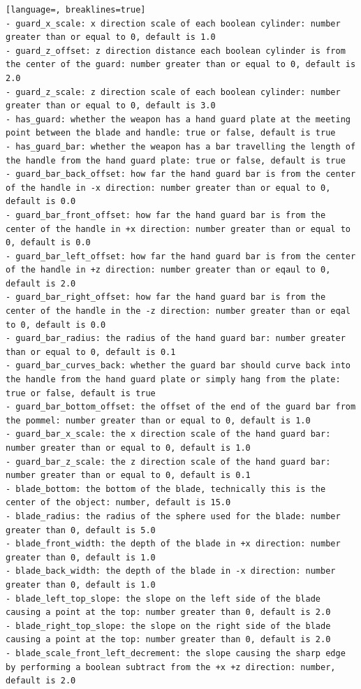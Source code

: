 \documentclass[12pt,a4paper]{article}
\begin{document}
\begin{lstlisting}[language=, breaklines=true]
- guard_x_scale: x direction scale of each boolean cylinder: number greater than or equal to 0, default is 1.0
- guard_z_offset: z direction distance each boolean cylinder is from the center of the guard: number greater than or equal to 0, default is 2.0
- guard_z_scale: z direction scale of each boolean cylinder: number greater than or equal to 0, default is 3.0
- has_guard: whether the weapon has a hand guard plate at the meeting point between the blade and handle: true or false, default is true
- has_guard_bar: whether the weapon has a bar travelling the length of the handle from the hand guard plate: true or false, default is true
- guard_bar_back_offset: how far the hand guard bar is from the center of the handle in -x direction: number greater than or equal to 0, default is 0.0
- guard_bar_front_offset: how far the hand guard bar is from the center of the handle in +x direction: number greater than or equal to 0, default is 0.0
- guard_bar_left_offset: how far the hand guard bar is from the center of the handle in +z direction: number greater than or eqaul to 0, default is 2.0
- guard_bar_right_offset: how far the hand guard bar is from the center of the handle in the -z direction: number greater than or eqal to 0, default is 0.0
- guard_bar_radius: the radius of the hand guard bar: number greater than or equal to 0, default is 0.1
- guard_bar_curves_back: whether the guard bar should curve back into the handle from the hand guard plate or simply hang from the plate: true or false, default is true
- guard_bar_bottom_offset: the offset of the end of the guard bar from the pommel: number greater than or equal to 0, default is 1.0
- guard_bar_x_scale: the x direction scale of the hand guard bar: number greater than or equal to 0, default is 1.0
- guard_bar_z_scale: the z direction scale of the hand guard bar: number greater than or equal to 0, default is 0.1
- blade_bottom: the bottom of the blade, technically this is the center of the object: number, default is 15.0
- blade_radius: the radius of the sphere used for the blade: number greater than 0, default is 5.0
- blade_front_width: the depth of the blade in +x direction: number greater than 0, default is 1.0
- blade_back_width: the depth of the blade in -x direction: number greater than 0, default is 1.0
- blade_left_top_slope: the slope on the left side of the blade causing a point at the top: number greater than 0, default is 2.0
- blade_right_top_slope: the slope on the right side of the blade causing a point at the top: number greater than 0, default is 2.0
- blade_scale_front_left_decrement: the slope causing the sharp edge by performing a boolean subtract from the +x +z direction: number, default is 2.0

\end{lstlisting}
\end{document}
